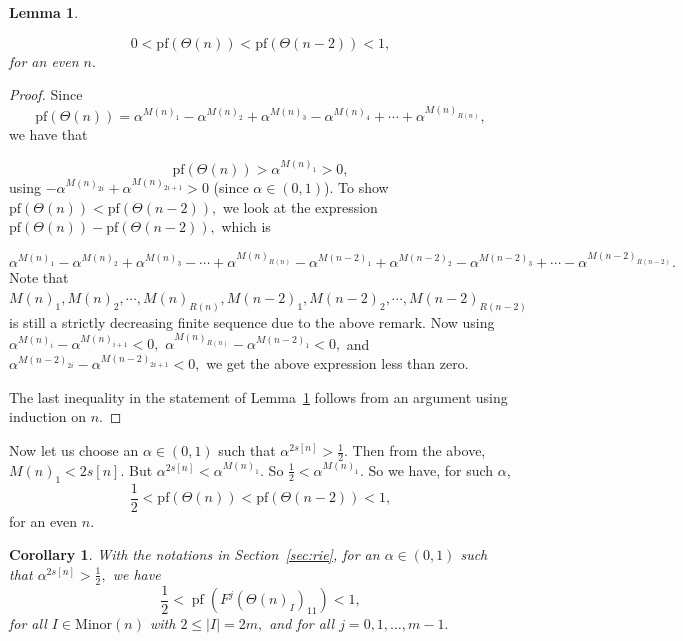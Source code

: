 \documentclass[9pt, BCOR=2mm]{amsart}
\numberwithin{equation}{section}
\numberwithin{equation}{section}
\newtheorem{lemma}[theorem]{Lemma}
\newtheorem{corollary}[theorem]{Corollary}
\begin{document}
\begin{lemma}\label{lem:pfaffian_in_0_1}

	$$0<\mathrm{pf}(\Theta(n))<\mathrm{pf}(\Theta(n-2))<1,$$ for an even $n.$ \end{lemma}
  \begin{proof}
  Since $$\mathrm{pf}(\Theta(n))=\alpha^{M(n)_1}-\alpha^{M(n)_2}+\alpha^{M(n)_3}-\alpha^{M(n)_4}+\cdots +\alpha^{M(n)_{R(n)}},$$ we have that

  $$\mathrm{pf}(\Theta(n))>\alpha^{M(n)_1}>0,$$ using $-\alpha^{M(n)_{2i}}+\alpha^{M(n)_{2i+1}}>0$ (since $\alpha \in (0,1)$). To show $\mathrm{pf}(\Theta(n))<\mathrm{pf}(\Theta(n-2)),$ we look at the expression $\mathrm{pf}(\Theta(n))-\mathrm{pf}(\Theta(n-2)),$ which is

  $$\alpha^{M(n)_1}-\alpha^{M(n)_2}+\alpha^{M(n)_3}-\cdots +\alpha^{M(n)_{R(n)}}-\alpha^{M(n-2)_1}+\alpha^{M(n-2)_2}-\alpha^{M(n-2)_3}+\cdots -\alpha^{M(n-2)_{R(n-2)}}.$$
  Note that $M(n)_1,M(n)_2,\cdots, M(n)_{R(n)},M(n-2)_1,M(n-2)_2,\cdots, M(n-2)_{R(n-2)}$ is still a strictly decreasing finite sequence due to the above remark. Now using $\alpha^{M(n)_i}-\alpha^{M(n)_{i+1}}<0,$ $\alpha^{M(n)_{R(n)}}-\alpha^{M(n-2)_{1}}<0,$ and $\alpha^{M(n-2)_{2i}}-\alpha^{M(n-2)_{2i+1}}<0,$ we get the above expression less than zero.

  The last inequality in the statement of Lemma~\ref{lem:pfaffian_in_0_1} follows from an argument using induction on $n.$
   \end{proof}


Now let us choose an $\alpha\in (0,1)$ such that $\alpha^{2s[n]}>\frac{1}{2}.$ Then from the above, $M(n)_1<2s[n].$ But $\alpha^{2s[n]}<\alpha^{M(n)_1}.$ So $\frac{1}{2}<\alpha^{M(n)_1}.$ So we have, for such $\alpha$, 
\begin{equation}\label{eq:pf_in_half_1}
	\frac{1}{2}<\mathrm{pf}(\Theta(n))<\mathrm{pf}(\Theta(n-2))<1,\end{equation} for an even $n.$ 

\begin{corollary} With the notations in Section~\ref{sec:rie}, for an $\alpha\in (0,1)$ such that $\alpha^{2s[n]}>\frac{1}{2},$ we have 
\begin{equation}
\frac{1}{2}<\operatorname{pf}\left(F^{j}\left(\Theta(n)_I\right)_{11}\right)<1,
\end{equation}
  for all $I\in \mathrm{Minor}(n)$  with  $2 \leq|I| =2m,$ and for all  $j=0,1, \ldots, m-1.$  	\end{corollary}
\end{document}
